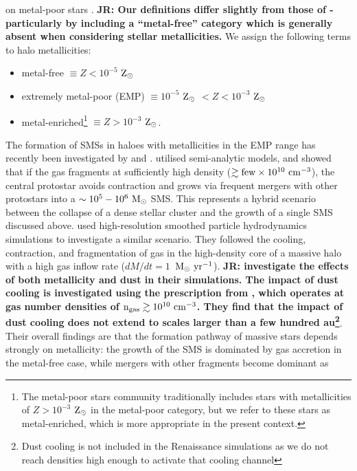 \documentclass[twocolumn,iop,revtex4]{openjournal}
\newcommand{\msolaryrc} {$\rm{M_{\odot}~yr^{-1}}$}
\newcommand{\zsolar} {$\rm{Z_{\odot}}~$}
\newcommand{\zsolarc} {$\rm{Z_{\odot}}$}
\def\jr#1{{\color{blue} \bf JR:  #1}}
\begin{document}
on metal-poor stars \citep[e.g.][]{Frebel_2015}. \jr{Our definitions differ slightly from those of
\cite{Frebel_2015} - particularly by including a ``metal-free'' category which is generally
absent when considering stellar metallicities.} We assign the following terms to halo metallicities:
\begin{itemize}
\item metal-free $\equiv Z < 10^{-5}$ \zsolarc 
\item extremely metal-poor (EMP) $\equiv 10^{-5}$ \zsolar $< Z < 10^{-3}$ \zsolarc 
\item metal-enriched\footnote{The metal-poor stars community traditionally includes stars with
  metallicities of $Z > 10^{-3}$ \zsolar in the metal-poor category, but we refer to these stars as metal-enriched, which 
  is more appropriate in the present context.} $\equiv Z > 10^{-3}$ \zsolarc.
\end{itemize}
  The formation of SMSs in haloes with metallicities in the EMP range
  has recently been investigated by \cite{Tagawa_2020} and \cite{Chon_2020}. \cite{Tagawa_2020}
  utilised semi-analytic models, and showed that if the gas fragments at sufficiently high
  density ($\gtrsim {\rm few}\times 10^{10}~{\rm cm^{-3}}$), the central protostar avoids contraction
  and grows via frequent mergers with other protostars into a $\sim 10^5-10^6~{\rm M_\odot}$ SMS.
  This represents a hybrid scenario between the collapse of a dense stellar cluster and the
  growth of a single SMS discussed above. \cite{Chon_2020} used high-resolution smoothed particle
  hydrodynamics simulations to investigate a similar scenario. They followed the cooling,
  contraction, and fragmentation of gas in the high-density core of a massive halo with a high
  gas inflow rate ($dM/dt=1$~\msolaryrc). \jr{\cite{Chon_2020} investigate the effects of
    both metallicity and dust in their simulations. The impact of
    dust cooling is investigated using the prescription from \cite{Omukai_2008}, which operates
    at gas number densities of $\rm{n_{gas} \gtrsim 10^{10} \ cm^{-3}}$. They find
    that the impact of dust cooling does not extend to scales larger than a few hundred
    au\footnote{Dust cooling is not included in the Renaissance simulations as we do not reach densities
      high enough to activate that cooling channel}}. Their overall findings are that the formation
  pathway of massive stars depends strongly on metallicity: the growth of the SMS is dominated by
  gas accretion in the metal-free case, while mergers with other fragments become dominant as
\end{document}
